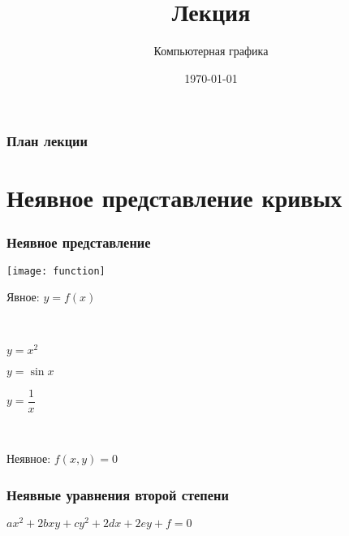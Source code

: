 \documentclass[10pt]{beamer}
\date{\today}
\title{Лекция \lecdni \\ \LectionTheme}
\subtitle{Компьютерная графика}
\begin{document}
 		 




\newcommand \abs[1] {\left| #1 \right|}

\everymath{\displaystyle}

    
\begin{comment}
\end{comment}


    
    
    \QRFRAME	
	

	\frame{\maketitle}

	
	\begin{frame}\frametitle{План лекции}
		\tableofcontents
	\end{frame}
	

\section{Неявное представление кривых}
\frame{\sectionpage}

\begin{frame}\frametitle{Неявное представление}
	
	{
		\texttt{[image: function]}
		
	}{
		
		Явное: 	$y=f(x)$
		
		~
		
		{\color{red}$y=x^2$}
		
		{\color{green}$y=\sin x$}
		
		{\color{blue}$y=\dfrac{1}{x}$}
		
		~ \pause
		
		Неявное: {\color{orange}$f(x,y) = 0$}
		
	}
	
\end{frame}

\begin{frame}\frametitle{Неявные уравнения второй степени}
	
	\centering
	$ax^2+2bxy+cy^2+2dx+2ey+f=0$
	
	
\end{frame}
\end{document}
